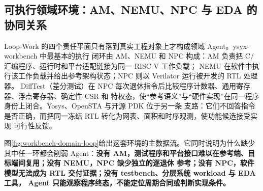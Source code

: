 \documentclass[UTF8,a4paper,zihao=-4,oneside]{ctexart}
\begin{document}
\subsection{可执行领域环境：AM、NEMU、NPC 与 EDA 的协同关系}

Loop-Work 的四个责任平面只有落到真实工程对象上才构成领域 Agent。ysyx-workbench 中最基本的执行
闭环由 AM、NEMU 和 NPC 构成：AM 负责把 C/汇编程序、运行时和平台适配链接为同一 RISC-V 工作负载；
NEMU 在软件中执行该工作负载并给出参考架构状态；NPC 则以 Verilator 运行被开发的 RTL 处理器。
DiffTest（差分测试）在 NPC 每次退休指令后比较程序计数器、通用寄存器、浮点寄存器、确定性 CSR 和
特权态，使“参考语义”与“硬件实现”在同一程序身份上闭合。Yosys、OpenSTA 与开源 PDK 位于另一条
支路：它们不回答指令是否正确，而把同一冻结 RTL 转化为网表、面积和时序观测，使功能候选接受实现
可行性反馈。

图\ref{fig:workbench-domain-loop}给出这套环境的主数据流。它同时说明为什么缺少其中任一环都会削弱
Agent：\textbf{没有 AM，测试程序和平台接口难以在参考端、目标端间复用；没有 NEMU，NPC 缺少独立的逐退休
参考；没有 NPC，软件模型无法成为 RTL 交付证据；没有 testbench、分层系统 workload 与 EDA 工具，
Agent 只能观察程序终态，不能定位周期合同或判断实现条件。}
\end{document}
